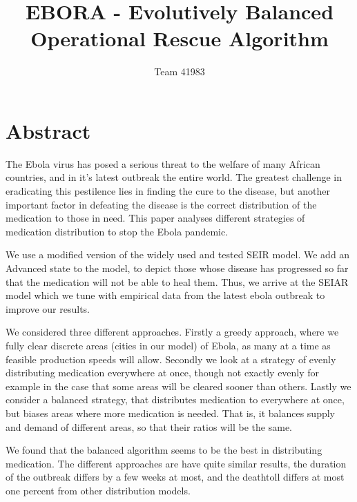 \documentclass[12pt]{article}
\title{EBORA - Evolutively Balanced Operational Rescue Algorithm}
\author{Team 41983}
\date{}                                           %
\begin{document}
\setlength{\parindent}{0cm}


\section{Abstract}

The Ebola virus has posed a serious threat to the welfare of many African countries, and in it's latest outbreak the entire world. The greatest challenge in eradicating this pestilence lies in finding the cure to the disease, but another important factor in defeating the disease is the correct distribution of the medication to those in need. This paper analyses different strategies of medication distribution to stop the Ebola pandemic.


We use a modified version of the widely used and tested SEIR model. We add an Advanced state to the model, to depict those whose disease has progressed so far that the medication will not be able to heal them. Thus, we arrive at the SEIAR model which we tune with empirical data from the latest ebola outbreak to improve our results.


We considered three different approaches. Firstly a greedy approach, where we fully clear discrete areas (cities in our model) of Ebola, as many at a time as feasible production speeds will allow. Secondly we look at a strategy of evenly distributing medication everywhere at once, though not exactly evenly for example in the case that some areas will be cleared sooner than others. Lastly we consider a balanced strategy, that distributes medication to everywhere at once, but biases areas where more medication is needed. That is, it balances supply and demand of different areas, so that their ratios will be the same.


We found that the balanced algorithm seems to be the best in distributing medication. The different approaches are have quite similar results, the duration of the outbreak differs by a few weeks at most, and the deathtoll differs at most one percent from other distribution models.
\end{document}
